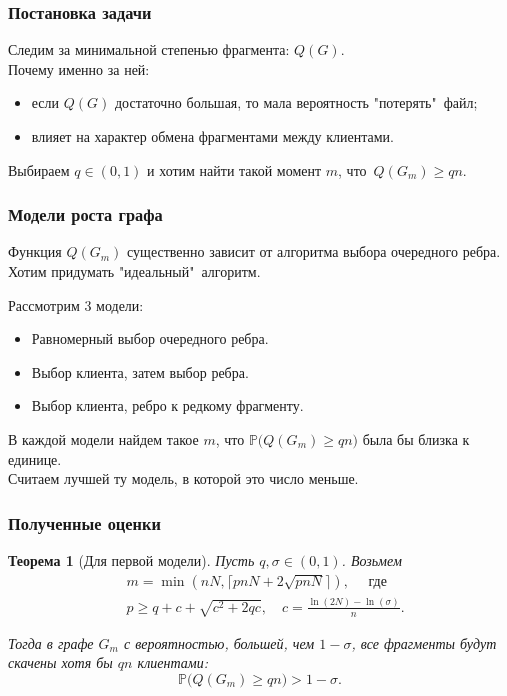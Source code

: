 \documentclass[pdf, intlimits, 12pt, unicode]{beamer} %
\newcommand{\PRob}{\mathbb P}
\newcommand{\geqs}{\geqslant}
\newtheorem*{theoremm}{Теорема}
\begin{document}
\begin{frame}
	\frametitle{Постановка задачи}
	Следим за минимальной степенью фрагмента: $Q(G)$.\\
	
	Почему именно за ней:
	\begin{itemize}
		\item если $Q(G)$ достаточно большая, то мала вероятность "потерять"\ файл;
		\item влияет на характер обмена фрагментами между клиентами.
	\end{itemize}
	Выбираем $q \in (0,1)$ и
	хотим найти такой момент $m$, что~$Q(G_m) \geqs qn$.
\end{frame}


\begin{frame}
	\frametitle{Модели роста графа}
	Функция $Q(G_m)$ существенно зависит от алгоритма выбора очередного ребра. \\
	Хотим придумать "идеальный"\ алгоритм.
 
	\bigskip

	Рассмотрим 3 модели:
	\begin{itemize}
		\item Равномерный выбор очередного ребра.
		\item Выбор клиента, затем выбор ребра.
		\item Выбор клиента, ребро к редкому фрагменту.
	\end{itemize}
	
	\medskip
	В каждой модели найдем такое $m$, что $\PRob\big(Q(G_m) \geqs qn\big)$ была бы близка к единице.\\
	Считаем лучшей ту модель, в которой это число меньше.
	
\end{frame}



\begin{frame}
	\frametitle{Полученные оценки}

\begin{theoremm}[Для первой модели]
	Пусть $q, \sigma \in (0, 1)$. Возьмем 
		\vspace{-3.5mm}
		\begin{align*}
		& m = \min(nN, \lceil pnN + 2\sqrt{pnN} \rceil), \quad \text{ где} \\
		& p \geqs q + c + \sqrt{c^2+2qc}, \quad c = \frac{\ln(2N) - \ln(\sigma)}{n}.
		\end{align*}
		\vspace{-6.5mm}
		
	Тогда в графе $G_m$ с вероятностью, большей, чем $1 - \sigma$, все фрагменты будут скачены хотя бы $qn$ клиентами:
		\vspace{-3.5mm}
		\begin{equation*}
		\PRob\big(Q(G_m) \geqs qn\big) > 1 - \sigma.
		\end{equation*}
\end{theoremm}

\end{frame}
\end{document}
